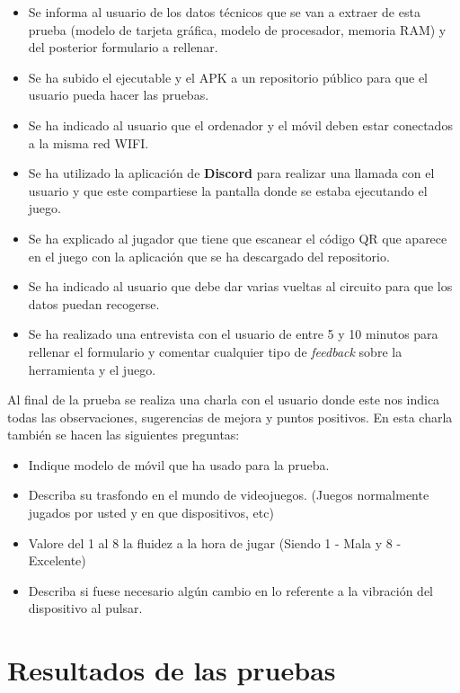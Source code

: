 \begin {itemize}
\item Se informa al usuario de los datos t\'ecnicos que se van a extraer de esta prueba (modelo de tarjeta gr\'afica, modelo de procesador, memoria RAM) y del posterior formulario a rellenar.
\item Se ha subido el ejecutable y el APK a un repositorio p\'ublico para que el usuario pueda hacer las pruebas.
\item Se ha indicado al usuario que el ordenador y el m\'ovil deben estar conectados a la misma red WIFI.
\item Se ha utilizado la aplicaci\'on de \textbf{Discord} para realizar una llamada con el usuario y que este compartiese la pantalla donde se estaba ejecutando el juego.
\item Se ha explicado al jugador que tiene que escanear el c\'odigo QR que aparece en el juego con la aplicaci\'on que se ha descargado del repositorio.
\item Se ha indicado al usuario que debe dar varias vueltas al circuito para que los datos puedan recogerse. 
\item Se ha realizado una entrevista con el usuario de entre 5 y 10 minutos para rellenar el formulario y comentar cualquier tipo de \textit{feedback} sobre la herramienta y el juego.
\end {itemize}

Al final de la prueba se realiza una charla con el usuario donde este nos indica todas las observaciones, sugerencias de mejora y puntos positivos. En esta charla tambi\'en se hacen las siguientes preguntas:

\begin {itemize}
\item Indique modelo de m\'ovil que ha usado para la prueba.
\item Describa su trasfondo en el mundo de videojuegos. (Juegos normalmente jugados por usted y en que dispositivos, etc)
\item Valore del 1 al 8 la fluidez a la hora de jugar (Siendo 1 - Mala y 8 - Excelente)
\item Describa si fuese necesario alg\'un cambio en lo referente a la vibraci\'on del dispositivo al pulsar.
\end {itemize}

\section{Resultados de las pruebas}

